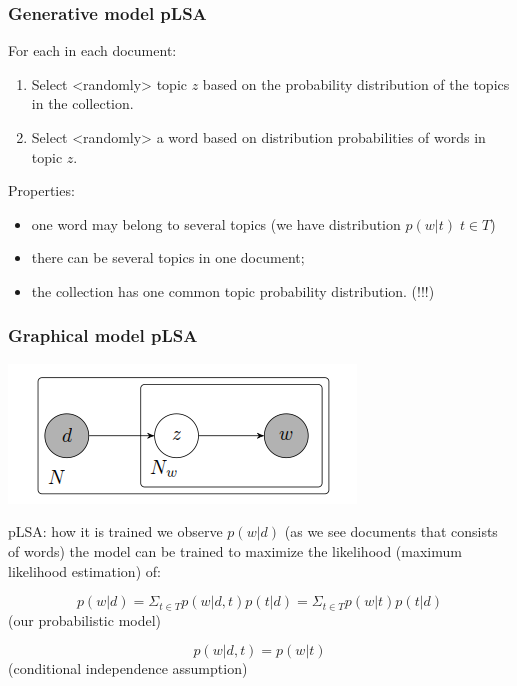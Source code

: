 \documentclass[svgnames]{beamer}
\begin{document}
    \begin{frame}
        \frametitle{Generative model pLSA}
        For each  in each document:
        \begin{enumerate}
            \item Select <randomly> topic $z$ based on
            the probability distribution of the topics in the collection.
            \item Select <randomly> a word based on distribution
            probabilities of words in topic $z$.
        \end{enumerate}
        Properties:
        \begin{itemize}
            \item one word may belong to several topics (we have distribution $p(w|t) \; t\in T$)
            \item there can be several topics in one document;
            \item the collection has one common topic probability distribution. (!!!)
        \end{itemize}
    \end{frame}

    \begin{frame}
        \frametitle{Graphical model pLSA}
        \centering
        \includegraphics[width=\textwidth]{plsa-model}
    \end{frame}

    \begin{frame}{pLSA: how it is trained}
        we observe $p(w|d)$ (as we see documents that consists of words)
        the model can be trained to maximize the likelihood (maximum likelihood estimation) of:

        $$p(w|d) = \Sigma_{t\in T} p(w|d, t)p(t|d) = \Sigma_{t\in T} p(w|t)p(t|d)$$
        (our probabilistic model)

        $$p(w|d, t) = p(w|t)$$ (conditional independence assumption)

    \end{frame}
\end{document}
